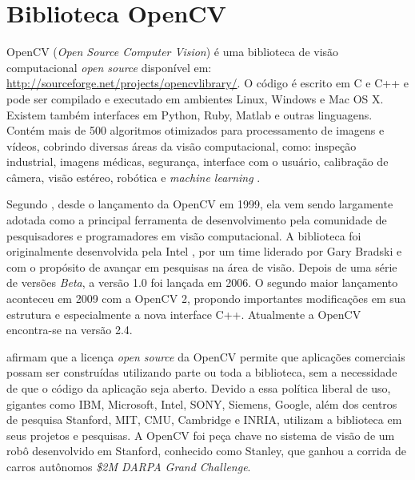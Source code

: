 





\section{Biblioteca OpenCV} %
\label{sec:biblioteca_opencv}

OpenCV (\textit{Open Source Computer Vision}) \citep{opencv_library} é uma biblioteca de visão computacional \textit{open source} disponível em: \url{http://sourceforge.net/projects/opencvlibrary/}. O código é escrito em C e C++ e pode ser compilado e executado em ambientes Linux, Windows e Mac OS X. Existem também interfaces em Python, Ruby, Matlab e outras linguagens. Contém mais de 500 algoritmos otimizados para processamento de imagens e vídeos, cobrindo diversas áreas da visão computacional, como: inspeção industrial, imagens médicas, segurança, interface com o usuário, calibração de câmera, visão estéreo, robótica e \textit{machine learning} \citep{opencv:2008:book}.

Segundo \cite{opencv2:2011:book}, desde o lançamento da OpenCV em 1999, ela vem sendo largamente adotada como a principal ferramenta de desenvolvimento pela comunidade de pesquisadores e programadores em visão computacional. A biblioteca foi originalmente desenvolvida pela Intel \citep{intel:2013:online}, por um time liderado por Gary Bradski e com o propósito de avançar em pesquisas na área de visão. Depois de uma série de versões \textit{Beta}, a versão 1.0 foi lançada em 2006. O segundo maior lançamento aconteceu em 2009 com a OpenCV 2, propondo importantes modificações em sua estrutura e especialmente a nova interface C++. Atualmente a OpenCV encontra-se na versão 2.4.

\cite{opencv:2008:book} afirmam que a licença \textit{open source} da OpenCV permite que aplicações comerciais possam ser construídas utilizando parte ou toda a biblioteca, sem a necessidade de que o código da aplicação seja aberto. Devido a essa política liberal de uso, gigantes como IBM, Microsoft, Intel, SONY, Siemens, Google, além dos centros de pesquisa Stanford, MIT, CMU, Cambridge e INRIA, utilizam a biblioteca em seus projetos e pesquisas. A OpenCV foi peça chave no sistema de visão de um robô desenvolvido em Stanford, conhecido como Stanley, que ganhou a corrida de carros autônomos \textit{\$2M DARPA Grand Challenge}.

